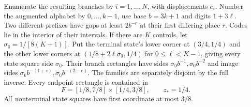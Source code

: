 Enumerate the resulting branches by $i=1,\ldots,N$, with displacements
$e_i$.  Number the augmented alphabet by $0,\ldots,k-1$, use base $b=3k+1$
and digits $1+3\ell$. Two different prefixes have gaps at least
$2b^{-r}$ at their first differing place $r$. Codes lie in the interior
of their intervals. If there are $K$ controls, let $\sigma_0=1/[8(K+1)]$.
Put the terminal state's lower corner at $(3/4,1/4)$ and the other lower
corners at $(1/8+2\ell\sigma_0,1/4)$ for $0\le\ell<K-1$, giving every state square side
$\sigma_0$. Their branch rectangles have sides
$\sigma_0b^{-1},\sigma_0b^{-2}$ and image sides
$\sigma_0b^{-(1+e)},\sigma_0b^{-(2-e)}$. The families are separately
disjoint by the full inverse. Every endpoint rectangle is contained in
\begin{equation}\label{bc:halfline-code}
 F=[1/8,7/8]\times[1/4,3/8],\qquad z_*=1/4.
\end{equation}
All nonterminal state squares have first coordinate at most $3/8$.

